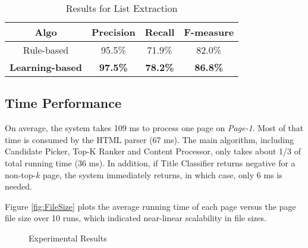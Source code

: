 \begin{table}
\centering
\caption{Results for List Extraction}
\begin{tabular}{|c||c|c|c|}
\hline
Algo  & Precision & Recall & F-measure\\\hline
Rule-based  & 95.5\% & 71.9\% & 82.0\% \\
\textbf{Learning-based}  & \textbf{97.5\%} & \textbf{78.2\%} & \textbf{86.8\%}\\
\hline
\end{tabular}
\label{tab:listRes}
\end{table}

\subsection{Time Performance}

On average, the system takes 109 ms to process one page on {\em Page-1}.
Most of that time is consumed by the HTML parser (67 ms). The main algorithm,
including Candidate Picker, Top-K Ranker and Content Processor,
only takes about 1/3 of total running time (36 ms).
In addition, if Title Classifier returns negative for a non-top-$k$ page,
the system immediately returns, in which case, only 6 ms is needed.

Figure \ref{fig:FileSize} plots the average running time of each page versus
the page file size over 10 runs, which indicated near-linear
scalability in file sizes.



\begin{figure*}[th]
\centering
{}
\caption{Experimental Results}
\label{fig:results}
\end{figure*}

